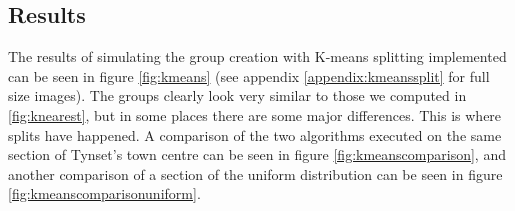 \subsection{Results}
The results of simulating the group creation with K-means splitting implemented can be seen in figure \ref{fig:kmeans} (see 
appendix \ref{appendix:kmeanssplit} for full size images). The groups clearly look very similar to those we computed in \ref{fig:knearest}, but in some places there are some major differences. This is where splits have happened. A comparison of the two algorithms executed on the same section of Tynset's town centre can be seen in figure \ref{fig:kmeanscomparison}, and another
comparison of a section of the uniform distribution can be seen in figure \ref{fig:kmeanscomparisonuniform}. 

\begin{figure}
	\centering
		\qquad
		\qquad


\end{figure}
